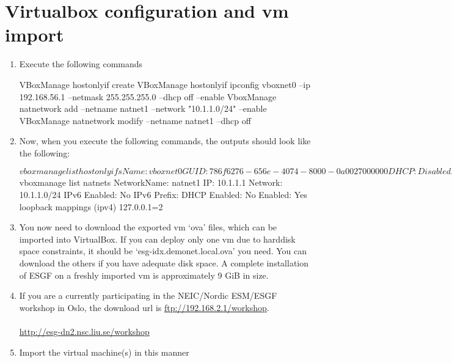 \section{Virtualbox configuration and vm import}
\begin{enumerate}
\item Execute the following commands
\begin{tiny}
\begin{verbatimtab}[4]
VBoxManage hostonlyif create
VBoxManage hostonlyif ipconfig vboxnet0 --ip 192.168.56.1 --netmask 255.255.255.0 --dhcp off --enable
VboxManage natnetwork add --netname natnet1 --network "10.1.1.0/24" --enable
VBoxManage natnetwork modify --netname natnet1 --dhcp off
\end{verbatimtab}
\end{tiny}
\newpage
\item Now, when you execute the following commands, the outputs should look like the following:
\begin{verbatimtab}$ vboxmanage list hostonlyifs
Name:            vboxnet0
GUID:            786f6276-656e-4074-8000-0a0027000000
DHCP:            Disabled
IPAddress:       192.168.56.1
NetworkMask:     255.255.255.0
IPV6Address:     fe80:0000:0000:0000:0800:27ff:fe00:0000
IPV6NetworkMaskPrefixLength: 64
HardwareAddress: 0a:00:27:00:00:00
MediumType:      Ethernet
Status:          Up
VBoxNetworkName: HostInterfaceNetworking-vboxnet0

[pchengi@direwolf ~]$ vboxmanage list natnets
NetworkName:    natnet1
IP:             10.1.1.1
Network:        10.1.1.0/24
IPv6 Enabled:   No
IPv6 Prefix:    
DHCP Enabled:   No
Enabled:        Yes
loopback mappings (ipv4)
        127.0.0.1=2
\end{verbatimtab}
\item You now need to download the exported vm `ova' files, which can be imported into VirtualBox. If you can deploy only one vm due to harddisk space constraints, it should be `esg-idx.demonet.local.ova' you need. You can download the others if you have adequate disk space. A complete installation of ESGF on a freshly imported vm is approximately 9 GiB in size.
\item If you are a currently participating in the NEIC/Nordic ESM/ESGF workshop in Oslo, the download url is \url{ftp://192.168.2.1/workshop}. \\  \\ \url{http://esg-dn2.nsc.liu.se/workshop}
\newpage
\item Import the virtual machine(s) in this manner
\begin{tiny}
\end{tiny}
\end{enumerate}
